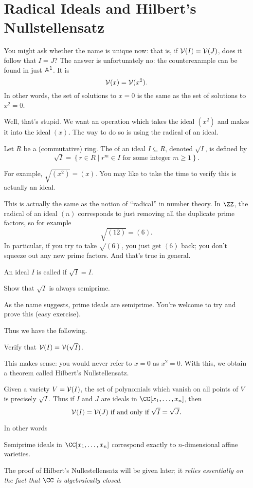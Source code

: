 \section{Radical Ideals and Hilbert's Nullstellensatz}
You might ask whether the name is unique now:
that is, if $\mathcal V(I) = \mathcal V(J)$, does it follow that $I=J$?
The answer is unfortunately no: the counterexample can be found in just $\mathbb A^1$.
It is
\[ \mathcal V(x) = \mathcal V(x^2). \]
In other words, the set of solutions to $x=0$ is the same as the set of solutions to $x^2=0$.

Well, that's stupid.
We want an operation which takes the ideal $(x^2)$ and makes it into the ideal $(x)$.
The way to do so is using the radical of an ideal.

\begin{definition}
	Let $R$ be a (commutative) ring.
	The  of an ideal $I \subseteq R$, denoted $\sqrt I$,
	is defined by
	\[
		\sqrt I =
		\left\{ r \in R
			\mid r^m \in I \text{ for some integer $m \ge 1$}  \right\}. 
	\]
\end{definition}
For example, $\sqrt{(x^2)} = (x)$.
You may like to take the time to verify this is actually an ideal.

This is actually the same as the notion of ``radical'' in number theory.
In $\ZZ$, the radical of an ideal $(n)$ corresponds to just removing all the duplicate prime factors, so for example
\[ \sqrt{(12)} = (6). \]
In particular, if you try to take $\sqrt{(6)}$, you just get $(6)$ back;
you don't squeeze out any new prime factors.
And that's true in general.

\begin{definition}
	An ideal $I$ is called  if $\sqrt I = I$.
\end{definition}
\begin{ques}
	Show that $\sqrt I$ is always semiprime.
\end{ques}
\begin{remark}
	As the name suggests, prime ideals are semiprime.
	You're welcome to try and prove this (easy exercise).
\end{remark}

Thus we have the following.
\begin{ques}
	Verify that $\mathcal V(I) = \mathcal V(\sqrt I)$.
\end{ques}
This makes sense: you would never refer to $x=0$ as $x^2=0$.
With this, we obtain a theorem called Hilbert's Nullstellensatz.
\begin{theorem}
	Given a variety $V = \mathcal V(I)$, the set of polynomials which vanish
	on all points of $V$ is precisely $\sqrt I$.
	Thus if $I$ and $J$ are ideals in $\CC[x_1, \dots, x_n]$,
	then \[ \mathcal V(I) = \mathcal V(J) \text{ if and only if $\sqrt I = \sqrt J$}. \]
\end{theorem}
In other words
\begin{moral}
	Semiprime ideals in $\CC[x_1, \dots, x_n]$ correspond
	exactly to $n$-dimensional affine varieties.
\end{moral}
The proof of Hilbert's Nullestellensatz will be given later;
it \emph{relies essentially on the fact that $\CC$ is algebraically closed}.


